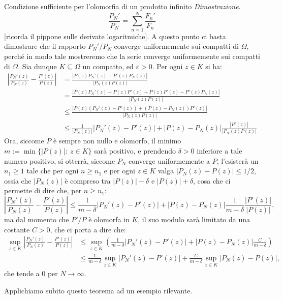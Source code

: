 \documentclass[11pt]{book}
\makeatletter
\theoremstyle{Definizione}
\theoremstyle{TeoremaProposizioneLemmaCorollarioCongettura}
\theoremstyle{OsservazioneNotaEsempio}
\renewenvironment{proof}[1][\proofname]{\par
  \normalfont \topsep6\p@\@plus6\p@\relax
  \trivlist
  \item[\hskip\labelsep
        \itshape
    #1\@addpunct{.}]\ignorespaces
}{%
  \endtrivlist\@endpefalse
}
\renewenvironment{proof}{\textsl{Dimostrazione}.}{}
\makeatother
\begin{document}
\begin{boxteo}{Condizione sufficiente per l'olomorfia di un prodotto infinito}
\begin{proof}
$$
\frac{P_N'}{P_N} = \sum_{n = 1}^N \frac{F_n'}{F_n}
$$
[ricorda il pippone sulle derivate logaritmiche]. A questo punto ci basta dimostrare che il rapporto $P_N'/P_N$ converge uniformemente sui compatti di $\Omega$, perché in modo tale mostreremo che la serie converge uniformemente sui compatti di $\Omega$. Sia dunque $K\subseteq \Omega$ un compatto, ed $\varepsilon > 0$. Per ogni $z\in K$ si ha:
\begin{align*}
\left|\frac{P_N'(z)}{P_N(z)}-\frac{P'(z)}{P(z)}\right| &= \frac{|P(z)P_N'(z)-P'(z)P_N(z)|}{|P_N(z)P(z)|} \\
&= \frac{|P(z)P_N'(z)-P(z)P'(z)+P(z)P'(z)-P'(z)P_N(z)|}{|P_N(z)P(z)|} \\
&\leq \frac{|P(z)(P_N'(z)-P'(z))+(P(z)-P_N(z))P'(z)|}{|P_N(z)P(z)|}\\
&\leq \frac{1}{|P_N(z)|}|P_N'(z)-P'(z)|+|P(z)-P_N(z)|\frac{|P'(z)|}{|P_N(z)P(z)|}
\end{align*}
Ora, siccome $P$ è sempre non nullo e olomorfo, il minimo $m:=\min\{|P(z)|:\ z\in K\}$ sarà positivo, e prendendo $\delta > 0$ inferiore a tale numero positivo, si otterrà, siccome $P_N$ converge uniformemente a $P$, l'esisterà un $n_1\geq 1$ tale che per ogni $n\geq n_1$ e per ogni $z\in K$ valga $|P_N(z)-P(z)| \leq 1/2$, ossia che $|P_N(z)|$ è compreso tra $|P(z)|-\delta$ e $|P(z)|+\delta$, cosa che ci permette di dire che, per $n \geq n_1$:
$$
\left|\frac{P_N'(z)}{P_N(z)}-\frac{P'(z)}{P(z)}\right| \leq \frac{1}{m-\delta}|P_N'(z)-P'(z)| + |P(z)-P_N(z)|\frac{1}{m-\delta}\frac{|P'(z)|}{|P(z)|},
$$
ma dal momento che $P'/P$ è olomorfa in $K$, il suo modulo sarà limitato da una costante $C > 0$, che ci porta a dire che:
\begin{align*}
\sup_{z\in K}\left|\frac{P_N'(z)}{P_N(z)}-\frac{P'(z)}{P(z)}\right| &\leq \sup_{z\in K}\left( \frac{1}{m-\delta}|P_N'(z)-P'(z)| + |P(z)-P_N(z)|\frac{C}{m-\delta}\right)\\
&\leq \frac{1}{m-\delta}\sup_{z\in K}|P_N'(z)-P'(z)| + \frac{C}{m-\delta}\sup_{z\in K} |P_N(z)-P(z)|,
\end{align*}
che tende a $0$ per $N \to \infty$.
\end{proof}
\end{boxteo}
\noindent
Applichiamo subito questo teorema ad un esempio rilevante.
\end{document}
